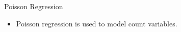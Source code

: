 \documentclass[00-GLMregslides.tex]{subfiles}
\begin{document}
%
 
\begin{frame}
	
	{\Large
		Poisson Regression
	}
	\begin{itemize}
		\item Poisson regression is used to model count variables.
	\end{itemize}
\end{frame}


% 

%
\end{document}

